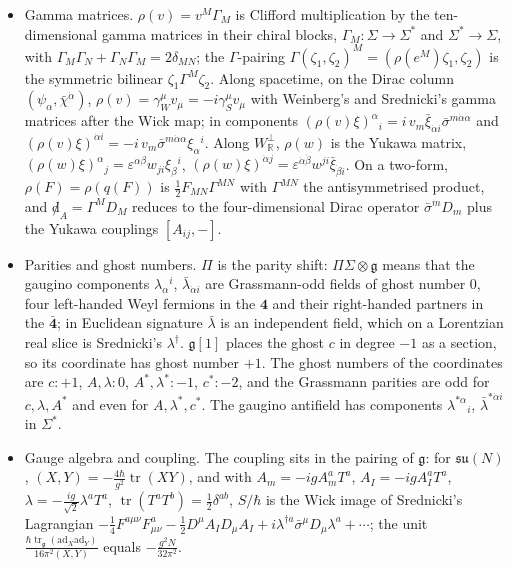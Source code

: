 \begin{remark}
\begin{itemize}
\[\]
on $\Sigma$ the spinor indices are lower and the $SU(4)$ index is upper on the $\mathbf 4$, lower on the $\bar{\mathbf 4}$; on $\Sigma^*$ all positions are reversed. The pairing $\Sigma\otimes\Sigma^*\to\mathbb C$ is $(\zeta,\chi)=\xi_\alpha{}^i\eta^\alpha{}_i-\bar\xi_{\dot\alpha i}\bar\eta^{\dot\alpha i}$, the minus sign on the dotted block being part of the convention of [ESW].
\item Gamma matrices. $\rho(v)=v^M\Gamma_M$ is Clifford multiplication by the ten-dimensional gamma matrices in their chiral blocks, $\Gamma_M\colon\Sigma\to\Sigma^*$ and $\Sigma^*\to\Sigma$, with $\Gamma_M\Gamma_N+\Gamma_N\Gamma_M=2\delta_{MN}$; the $\Gamma$-pairing $\Gamma(\zeta_1,\zeta_2)^M=(\rho(e^M)\zeta_1,\zeta_2)$ is the symmetric bilinear $\zeta_1\Gamma^M\zeta_2$. Along spacetime, on the Dirac column $(\psi_\alpha,\bar\chi^{\dot\alpha})$, $\rho(v)=\gamma_W^\mu v_\mu=-i\gamma_S^\mu v_\mu$ with Weinberg's and Srednicki's gamma matrices after the Wick map; in components $(\rho(v)\xi)^\alpha{}_i=i\,v_m\bar\xi_{\dot\alpha i}\bar\sigma^{m\dot\alpha\alpha}$ and $(\rho(v)\xi)^{\dot\alpha i}=-i\,v_m\bar\sigma^{m\dot\alpha\alpha}\xi_\alpha{}^i$. Along $W_{\mathbb R}^\perp$, $\rho(w)$ is the Yukawa matrix, $(\rho(w)\xi)^\alpha{}_j=\varepsilon^{\alpha\beta}w_{ji}\xi_\beta{}^i$, $(\rho(w)\xi)^{\dot\alpha j}=\varepsilon^{\dot\alpha\dot\beta}w^{ji}\bar\xi_{\dot\beta i}$. On a two-form, $\rho(F)=\rho(q(F))$ is $\tfrac12F_{MN}\Gamma^{MN}$ with $\Gamma^{MN}$ the antisymmetrised product, and ${\not d}_A=\Gamma^MD_M$ reduces to the four-dimensional Dirac operator $\bar\sigma^mD_m$ plus the Yukawa couplings $[A_{ij},-]$.
\item Parities and ghost numbers. $\Pi$ is the parity shift: $\Pi\Sigma\otimes\mathfrak g$ means that the gaugino components $\lambda_\alpha{}^i$, $\bar\lambda_{\dot\alpha i}$ are Grassmann-odd fields of ghost number $0$, four left-handed Weyl fermions in the $\mathbf 4$ and their right-handed partners in the $\bar{\mathbf 4}$; in Euclidean signature $\bar\lambda$ is an independent field, which on a Lorentzian real slice is Srednicki's $\lambda^\dagger$. $\mathfrak g[1]$ places the ghost $c$ in degree $-1$ as a section, so its coordinate has ghost number $+1$. The ghost numbers of the coordinates are $c:+1$, $A,\lambda:0$, $A^*,\lambda^*:-1$, $c^*:-2$, and the Grassmann parities are odd for $c,\lambda,A^*$ and even for $A,\lambda^*,c^*$. The gaugino antifield has components $\lambda^{*\alpha}{}_i$, $\bar\lambda^{*\dot\alpha i}$ in $\Sigma^*$.
\item Gauge algebra and coupling. The coupling sits in the pairing of $\mathfrak g$: for $\mathfrak{su}(N)$, $(X,Y)=-\tfrac{4\hbar}{g^2}\operatorname{tr}(XY)$, and with $A_m=-igA^a_mT^a$, $A_I=-igA^a_IT^a$, $\lambda=-\tfrac{ig}{\sqrt2}\lambda^aT^a$, $\operatorname{tr}(T^aT^b)=\tfrac12\delta^{ab}$, $S/\hbar$ is the Wick image of Srednicki's Lagrangian $-\tfrac14F^{a\mu\nu}F^a_{\mu\nu}-\tfrac12D^\mu A_ID_\mu A_I+i\lambda^{\dagger a}\bar\sigma^\mu D_\mu\lambda^a+\cdots$; the unit $\frac{\hbar\operatorname{tr}_{\mathfrak g}(\mathrm{ad}_X\mathrm{ad}_Y)}{16\pi^2(X,Y)}$ equals $-\frac{g^2N}{32\pi^2}$.

\end{itemize}
\end{remark}
